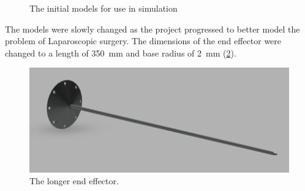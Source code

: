 \documentclass[BTech]{iitmdiss}
\begin{document}
    \begin{figure}%
        \centering
        \qquad
        \qquad
        \caption{The initial models for use in simulation}
        \label{fig:initial_simulation_models}
    \end{figure}

    The models were slowly changed as the project progressed to better model the problem of Laparoscopic surgery.
    The dimensions of the end effector were changed to a length of \SI{350}{\milli\meter} and base radius of \SI{2}{\milli\meter} (\ref{fig:longer_ee}).

    \begin{figure}
        \centering
        \includegraphics[width=0.75 \linewidth]{./img/longer_end_effector}
        \caption{The longer end effector.}
        \label{fig:longer_ee}
    \end{figure}
\end{document}
